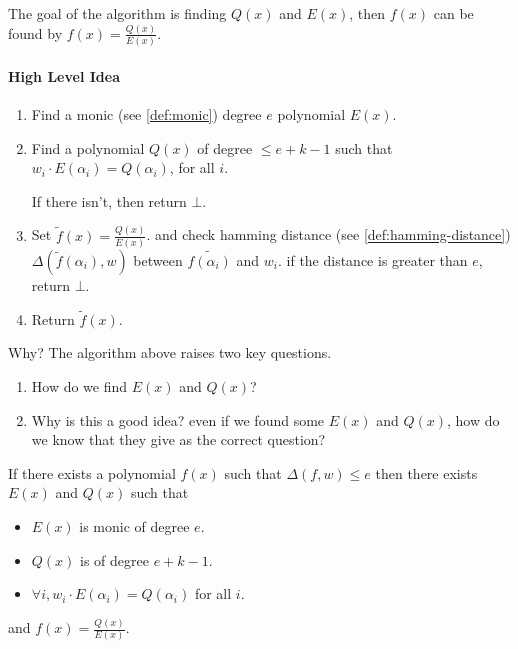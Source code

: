 The goal of the algorithm is finding $Q(x)$ and $E(x)$,
 then $f(x)$ can be found by $f(x)=\frac{Q(x)}{E(x)}$.

\paragraph{High Level Idea}
\begin{enumerate}
    \item Find a monic (see \autoref{def:monic}) degree $e$ polynomial $E(x)$.
    \item Find a polynomial $Q(x)$ of degree $\le e+k-1$ such 
    that $w_i\cdot E(\alpha_i)=Q(\alpha_i)$, for all $i$.

    If there isn't, then return $\bot$.
    \item Set $\tilde{f}(x)=\frac{Q(x)}{E(x)}$. and check hamming distance 
    (see \autoref{def:hamming-distance}) $\Delta(\tilde{f}(\alpha_i),w)$ 
    between $\tilde{f(\alpha_i)}$ and $w_i$.
    if the distance is greater than $e$, return $\bot$.
    \item Return $\tilde{f}(x)$.
\end{enumerate}


\begin{bclogo}[logo=\bcquestion]{Why?}
    The algorithm above raises two key questions.
    \begin{enumerate}
        \item How do we find $E(x)$ and $Q(x)$?
        \item Why is this a good idea? even if we found some $E(x)$ and $Q(x)$, 
        how do we know that they give as the correct question?
    \end{enumerate}    
\end{bclogo}


\begin{theorem}
 If there exists a polynomial $f(x)$ such that $\Delta(f,w)\le e$
 then there exists $E(x)$ and $Q(x)$ such that 

 \begin{itemize}
    \item $E(x)$ is monic of degree $e$.
    \item $Q(x)$ is of degree $e+k-1$.
    \item $\forall i, w_i\cdot E(\alpha_i)=Q(\alpha_i)$ for all $i$.
 \end{itemize}\label{theorem:berlekamp-welch:demands}

 and $f(x)=\frac{Q(x)}{E(x)}$.
\end{theorem}

